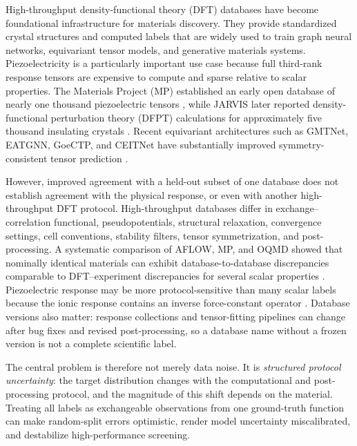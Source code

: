 \documentclass[11pt]{article}
\begin{document}
High-throughput density-functional theory (DFT) databases have become foundational infrastructure for materials discovery. They provide standardized crystal structures and computed labels that are widely used to train graph neural networks, equivariant tensor models, and generative materials systems. Piezoelectricity is a particularly important use case because full third-rank response tensors are expensive to compute and sparse relative to scalar properties. The Materials Project (MP) established an early open database of nearly one thousand piezoelectric tensors \cite{dejong2015}, while JARVIS later reported density-functional perturbation theory (DFPT) calculations for approximately five thousand insulating crystals \cite{choudhary2020}. Recent equivariant architectures such as GMTNet, EATGNN, GoeCTP, and CEITNet have substantially improved symmetry-consistent tensor prediction \cite{yan2024,dong2025,hua2026,jin2026}.

However, improved agreement with a held-out subset of one database does not establish agreement with the physical response, or even with another high-throughput DFT protocol. High-throughput databases differ in exchange--correlation functional, pseudopotentials, structural relaxation, convergence settings, cell conventions, stability filters, tensor symmetrization, and post-processing. A systematic comparison of AFLOW, MP, and OQMD showed that nominally identical materials can exhibit database-to-database discrepancies comparable to DFT--experiment discrepancies for several scalar properties \cite{hegde2023}. Piezoelectric response may be more protocol-sensitive than many scalar labels because the ionic response contains an inverse force-constant operator \cite{wuvanderbilt2005,choudhary2020}. Database versions also matter: response collections and tensor-fitting pipelines can change after bug fixes and revised post-processing, so a database name without a frozen version is not a complete scientific label.

The central problem is therefore not merely data noise. It is \emph{structured protocol uncertainty}: the target distribution changes with the computational and post-processing protocol, and the magnitude of this shift depends on the material. Treating all labels as exchangeable observations from one ground-truth function can make random-split errors optimistic, render model uncertainty miscalibrated, and destabilize high-performance screening.
\end{document}
